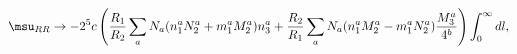 \begin{equation}
\msu_{RR} \rightarrow 
-2^5 c \left(\frac{R_1}{R_2}\sum_{a}N_a(n^a_1N^a_2+m^a_1M^a_2)n^a_3
+\frac{R_2}{R_1}\sum_{a}N_a(n^a_1M^a_2-m^a_1N^a_2)\frac{M^a_3}{4^b}\right)
\int_0^{\infty}dl
,\label{FormulaRRtadpoleMS}
\end{equation}

